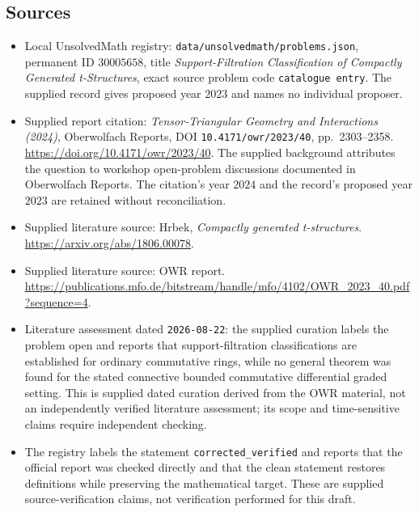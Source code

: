 \documentclass[11pt]{article}
\begin{document}
\subsection{Sources}
\begin{itemize}
\item Local UnsolvedMath registry: \texttt{data/unsolvedmath/problems.json}, permanent ID \(30005658\), title \emph{Support-Filtration Classification of Compactly Generated t-Structures}, exact source problem code \texttt{catalogue entry}. The supplied record gives proposed year \(2023\) and names no individual proposer.
\item Supplied report citation: \emph{Tensor-Triangular Geometry and Interactions (2024)}, Oberwolfach Reports, DOI \texttt{10.4171/owr/2023/40}, pp.\ 2303--2358. \url{https://doi.org/10.4171/owr/2023/40}. The supplied background attributes the question to workshop open-problem discussions documented in Oberwolfach Reports. The citation's year \(2024\) and the record's proposed year \(2023\) are retained without reconciliation.
\item Supplied literature source: Hrbek, \emph{Compactly generated t-structures}. \url{https://arxiv.org/abs/1806.00078}.
\item Supplied literature source: OWR report. \url{https://publications.mfo.de/bitstream/handle/mfo/4102/OWR_2023_40.pdf?sequence=4}.
\item Literature assessment dated \texttt{2026-08-22}: the supplied curation labels the problem open and reports that support-filtration classifications are established for ordinary commutative rings, while no general theorem was found for the stated connective bounded commutative differential graded setting. This is supplied dated curation derived from the OWR material, not an independently verified literature assessment; its scope and time-sensitive claims require independent checking.
\item The registry labels the statement \texttt{corrected\_verified} and reports that the official report was checked directly and that the clean statement restores definitions while preserving the mathematical target. These are supplied source-verification claims, not verification performed for this draft.
\end{itemize}
\end{document}
